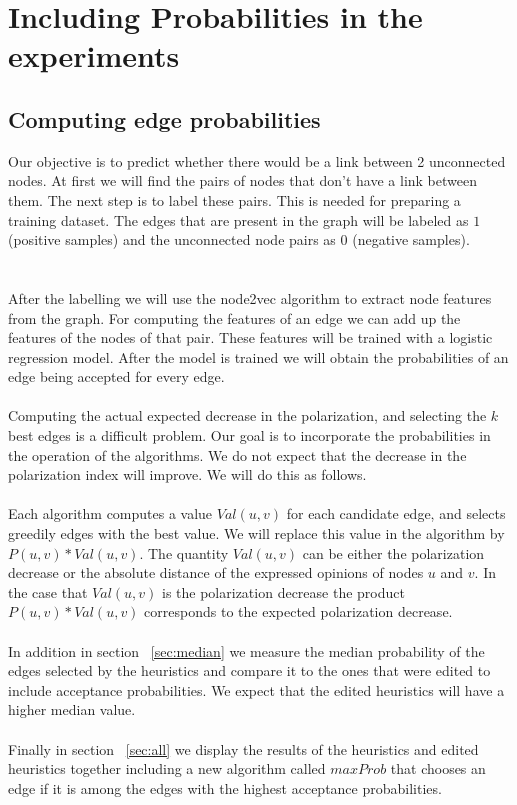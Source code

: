 \chapter{Including Probabilities in the experiments}		
 \label{sec:prob}		

\section{Computing edge probabilities }		
\label{sec:computingEdge}		
\vspace{20pt}
Our objective is to predict whether there would be a link between 2 unconnected nodes. At first we will find the pairs of nodes that don't have a link between them.	
The next step is to label these pairs. This is needed for preparing a training dataset. 
The edges that are present in the graph will be labeled as $1$ (positive samples) and the unconnected node pairs as $0$ (negative samples).		
\\
\\
\\
\noindent After the labelling we will use the node2vec algorithm to extract node features from the graph. For computing the features of an edge we can add up the features of the nodes of that pair. These features will be trained with a logistic regression model. After the model is trained we will obtain the probabilities of an edge being accepted for every edge.
\\
\\
\noindent Computing the actual expected decrease in the polarization, and selecting the $k$ best edges is a difficult problem. Our goal is to incorporate the probabilities in the operation of the algorithms. We do not expect that the decrease in the polarization index will improve. We will do this as follows. 
\\
\\
Each algorithm computes a value $Val(u,v)$ for each candidate edge, and selects greedily edges with the best value. We will replace this value in the algorithm by $P(u,v)*Val(u,v)$. The quantity $Val(u,v)$ can be either the polarization decrease or the absolute distance of the expressed opinions of nodes $u$ and $v$. In the case that $Val(u,v)$ is the polarization decrease the product $P(u,v)*Val(u,v)$ corresponds to the expected polarization decrease.
\\
\\
In addition in section ~\ref{sec:median} we measure the median probability of the edges selected by the heuristics and compare it to the ones that were edited to include acceptance probabilities. We expect that the edited heuristics will have a higher median value.
\\
\\
Finally in section ~\ref{sec:all} we display the results of the heuristics and edited heuristics together including a new algorithm called $maxProb$ that chooses an edge if it is among the edges with the highest acceptance probabilities.

